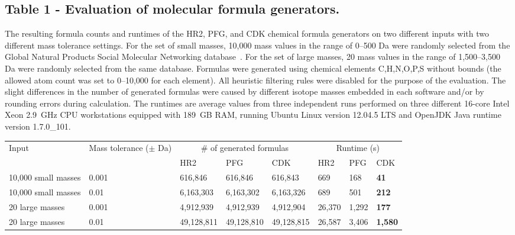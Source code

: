\documentclass[10pt]{bmcart}
\begin{document}
\begin{backmatter}
  \subsection*{Table 1 - Evaluation of molecular formula generators.}
  \label{tab:formula_generators}
  The resulting formula counts and runtimes of the HR2, PFG, and CDK chemical
formula generators on two different inputs with two different mass tolerance
settings. For the set of small masses, 10,000 mass values in the range of
0--500 Da were randomly selected from the Global Natural Products Social
Molecular Networking database~\cite{wang2016}. For the set of large masses, 20
mass values in the range of 1,500--3,500 Da were randomly selected from the same
database. Formulas were generated using chemical elements C,H,N,O,P,S without
bounds (the allowed atom count was set to 0--10,000 for each element). All
heuristic filtering rules were disabled for the purpose of the evaluation. The
slight differences in the number of generated formulas were caused by different
isotope masses embedded in each software and/or by rounding errors during
calculation. The runtimes are average values from three independent runs
performed on three different 16-core Intel Xeon 2.9~GHz CPU workstations
equipped with 189~GB RAM, running Ubuntu Linux version 12.04.5 LTS and OpenJDK
Java runtime version 1.7.0\_101.
  \baselineskip

    \begin{minipage}{1\textwidth}
    \centering
    \begin{tabular}{llllllll}
	\multirow{2}{1in}{ Input } & \multirow{2}{1in}{ Mass tolerance ($\pm$ Da) } & \multicolumn{3}{c}{ \# of generated formulas } & \multicolumn{3}{c}{ Runtime (s) } \\
	& & HR2 & PFG & CDK & HR2 & PFG & CDK \\
	10,000 small masses & 0.001 & 616,846 & 616,846 & 616,843 & 669 & 168 & \textbf{41} \\
	10,000 small masses & 0.01 & 6,163,303 & 6,163,302 & 6,163,326 & 689 & 501 & \textbf{212} \\
	20 large masses & 0.001 & 4,912,939 & 4,912,939 & 4,912,904 & 26,370 & 1,292 & \textbf{177} \\
	20 large masses & 0.01 & 49,128,811 & 49,128,810 & 49,128,815 & 26,587 & 3,406 & \textbf{1,580} \\
    \end{tabular}
    \end{minipage}


\end{backmatter}
\end{document}
